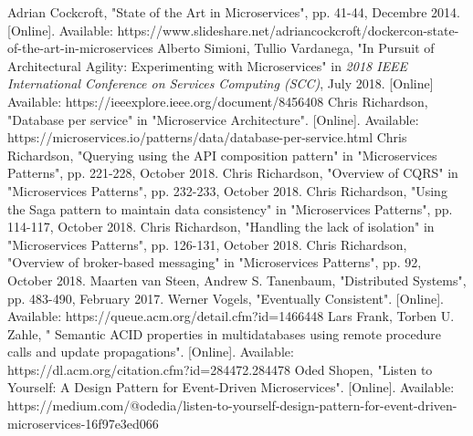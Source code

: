 \documentclass[conference]{IEEEtran}
\begin{document}
%
%
%
\begin{thebibliography}{1}

Adrian Cockcroft, "State of the Art in Microservices", pp. 41-44, Decembre 2014. [Online]. Available: https://www.slideshare.net/adriancockcroft/dockercon-state-of-the-art-in-microservices
Alberto Simioni, Tullio Vardanega, "In Pursuit of Architectural Agility: Experimenting with Microservices" in \textit{2018 IEEE International Conference on Services Computing (SCC)}, July 2018. [Online] Available: https://ieeexplore.ieee.org/document/8456408
Chris Richardson, "Database per service" in "Microservice Architecture". [Online]. Available: https://microservices.io/patterns/data/database-per-service.html
Chris Richardson, "Querying using the API composition pattern" in "Microservices Patterns", pp. 221-228, October 2018.
Chris Richardson, "Overview of CQRS" in "Microservices Patterns", pp. 232-233, October 2018.
Chris Richardson, "Using the Saga pattern to maintain data consistency" in "Microservices Patterns", pp. 114-117, October 2018.
Chris Richardson, "Handling the lack of isolation" in "Microservices Patterns", pp. 126-131, October 2018.
Chris Richardson, "Overview of broker-based messaging" in "Microservices Patterns", pp. 92, October 2018.
Maarten van Steen, Andrew S. Tanenbaum, "Distributed Systems", pp. 483-490, February 2017.
Werner Vogels, "Eventually Consistent". [Online]. Available: https://queue.acm.org/detail.cfm?id=1466448
Lars Frank, Torben U. Zahle, "
Semantic ACID properties in multidatabases using remote procedure calls and update propagations". [Online]. Available: https://dl.acm.org/citation.cfm?id=284472.284478
Oded Shopen, "Listen to Yourself: A Design Pattern for Event-Driven Microservices". [Online]. Available: https://medium.com/@odedia/listen-to-yourself-design-pattern-for-event-driven-microservices-16f97e3ed066

\end{thebibliography}




\end{document}
